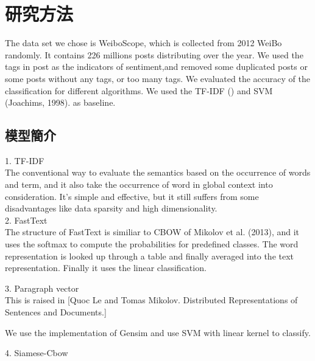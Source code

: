 \chapter{研究方法}

The data set we chose is WeiboScope, which is collected from 2012 WeiBo randomly. It contains 226 millions posts distributing over the year. We used the tags in post as the indicators of sentiment,and removed some duplicated posts or some posts without any tags, or too many tags. We evaluated the accuracy of the classification for different algorithms.  We used the TF-IDF () and SVM (Joachims, 1998). as baseline.

\section{模型簡介}

1. TF-IDF\\

	The conventional way to evaluate the semantics based on the occurrence of words     and term, and it also take the occurrence of word in global context into consideration.  It's simple and effective, but it still suffers from some disadvantages like data sparsity and high dimensionality. \\
	
2. FastText\\
	
	The structure of FastText is similiar to CBOW of Mikolov et al. (2013), and it uses the softmax to compute the probabilities for predefined classes. The word representation is looked up through a table and finally averaged into the text representation. Finally it uses the linear classification.
 

3. Paragraph vector\\

	This is raised in [Quoc Le and Tomas Mikolov. Distributed Representations of Sentences and Documents.] 

We use the implementation of Gensim and use SVM with linear kernel to classify. 

4. Siamese-Cbow\\

